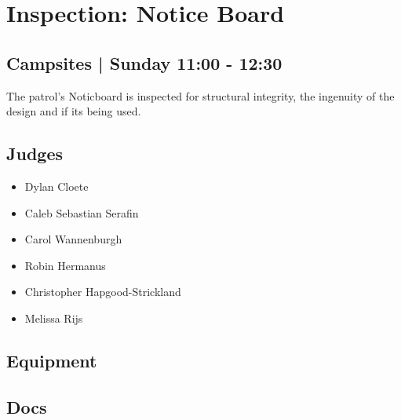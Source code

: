 \documentclass[10pt]{article}
\begin{document}
		\begin{minipage}{\linewidth}
		\setcounter{section}{43}
	\section{Inspection: Notice Board }
	\subsection*{Campsites | Sunday 11:00 - 12:30}

	The patrol's Noticboard is inspected for structural integrity, the ingenuity of the design and if its being used.

	\begin{multicols}{2}
	\subsection*{\faUsers \: Judges}
	\begin{itemize}
			\item Dylan Cloete
			\item Caleb Sebastian Serafin
			\item Carol Wannenburgh
			\item Robin Hermanus
			\item Christopher Hapgood-Strickland
			\item Melissa Rijs
		\end{itemize}
	\columnbreak
	\subsection*{\faWrench \: Equipment}
	        \vfill\null
        \subsection*{\faFile \: Docs}
     	\end{multicols}


	\vspace{1cm}
	\end{minipage}
\end{document}
